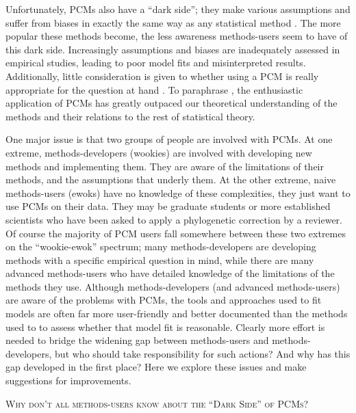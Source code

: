 \documentclass[a4paper,12pt]{article}
\renewcommand{\section}[1]{
  \bigskip
  \begin{center}
  \begin{Large}
  \normalfont\scshape #1
  \medskip
  \end{Large}
  \end{center}
}
\begin{document}
Unfortunately, PCMs also have a ``dark side''; they make various assumptions and suffer from biases in exactly the same way as any statistical method \citep{freckleton2009seven,boettiger2012your}. 
The more popular these methods become, the less awareness methods-users seem to have of this dark side. Increasingly assumptions and biases are inadequately assessed in empirical studies, leading to poor model fits and misinterpreted results. 
Additionally, little consideration is given to whether using a PCM is really appropriate for the question at hand \citep{losos2011seeing}. 
To paraphrase \citet{blomberg2012independent}, the enthusiastic application of PCMs has greatly outpaced our theoretical understanding of the methods and their relations to the rest of statistical theory.


One major issue is that two groups of people are involved with PCMs. 
At one extreme, methods-developers (wookies) are involved with developing new methods and implementing them. They are aware of the limitations of their methods, and the assumptions that underly them. 
At the other extreme, naive methods-users (ewoks) have no knowledge of these complexities, they just want to use PCMs on their data. 
They may be graduate students or more established scientists who have been asked to apply a phylogenetic correction by a reviewer. 
Of course the majority of PCM users fall somewhere between these two extremes on the ``wookie-ewok'' spectrum; many methods-developers are developing methods with a specific empirical question in mind, while there are many advanced methods-users who have detailed knowledge of the limitations of the methods they use. 
Although methods-developers (and advanced methods-users) are aware of the problems with PCMs, the tools and approaches used to fit models are often far more user-friendly and better documented than the methods used to to assess whether that model fit is reasonable. 
Clearly more effort is needed to bridge the widening gap between methods-users and methods-developers, but who should take responsibility for such actions? And why has this gap developed in the first place? Here we explore these issues and make suggestions for improvements.\\ %

\section{Why don't all methods-users know about the ``Dark Side'' of PCMs?}
\end{document}
